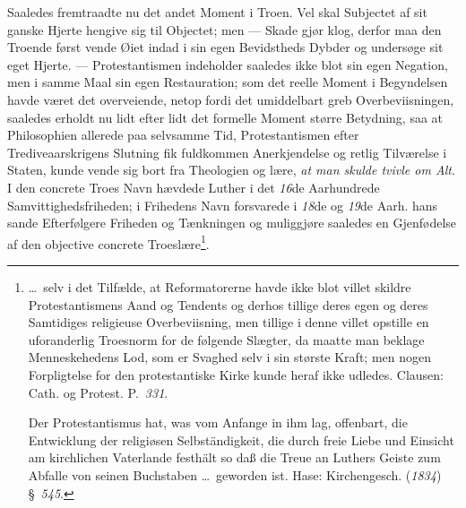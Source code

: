 \documentclass[12pt]{book}
\newcommand{\opage}[1]{\marginnote{\footnotesize\textit{[#1]}}}
\begin{document}
Saaledes fremtraadte nu det andet Moment i Troen. Vel skal Subjectet af sit
ganske Hjerte hengive sig til Objectet; men --- Skade gjør klog, derfor maa
den Troende først vende Øiet indad i sin egen Bevidstheds Dybder og undersøge
sit eget Hjerte. --- Protestantismen indeholder saaledes ikke blot sin egen
Negation, men i samme Maal sin egen Restauration; som det reelle Moment i
Begyndelsen havde været det overveiende, netop fordi det umiddelbart greb
Overbeviisningen, saaledes erholdt nu lidt efter lidt det formelle Moment
større Betydning, saa at Philosophien allerede paa selvsamme Tid,
Protestantismen efter Trediveaarskrigens Slutning fik fuldkommen
Anerkjendelse og retlig Tilværelse i Staten, kunde vende sig bort fra
Theologien og lære, \emph{at man skulde tvivle om Alt}. I den concrete Troes
Navn hævdede Luther i det \textit{16}de Aarhundrede Samvittighedsfriheden; i
Frihedens Navn forsvarede i \textit{18}de og \textit{19}de Aarh. hans
\opage{87} %
\setcounter{footnote}{0}%
sande Efterfølgere Friheden og Tænkningen og muliggjøre saaledes en
Gjenfødelse af den objective concrete Troeslære\footnote{\ldots\ selv i det
Tilfælde, at Reformatorerne havde ikke blot villet skildre Protestantismens
Aand og Tendents og derhos tillige deres egen og deres Samtidiges religieuse
Overbeviisning, men tillige i denne villet opstille en uforanderlig Troesnorm
for de følgende Slægter, da maatte man beklage Menneskehedens Lod, som er
Svaghed selv i sin største Kraft; men nogen Forpligtelse for den
protestantiske Kirke kunde heraf ikke udledes. Clausen: Cath. og Protest.
P.~\textit{331}.\par
Der Protestantismus hat, was vom Anfange in ihm lag, offenbart, die
Entwicklung der religiøsen Selbständigkeit, die durch freie Liebe und Einsicht
am kirchlichen Vaterlande festhält so daß die Treue an Luthers Geiste zum
Abfalle von seinen Buchstaben \ldots\ geworden ist. Hase: Kirchengesch.
(\textit{1834}) §~\textit{545}.}.
\end{document}
